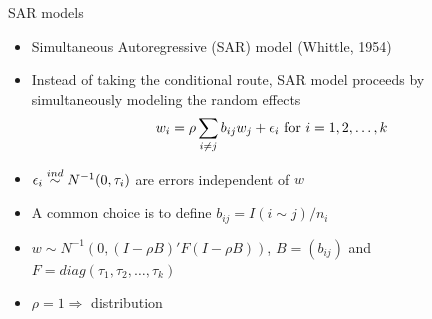 \begin{frame}{SAR models}
	\begin{itemize}
		\item \alert{Simultaneous Autoregressive (SAR)} model (Whittle, 1954)
		\item  Instead of taking the conditional route, SAR model proceeds by simultaneously modeling the random effects
		\[
		w_i =\rho \sum_{i \neq j} b_{ij} w_j + \epsilon_i \mbox{ for } i=1,2,\ldots,k
		\]
		\item $\epsilon_i \overset{ind}{\sim} N^{-1}(0,\tau_i)$ are errors independent of $w$   
		\item A common choice is to define $b_{ij}=I(i \sim j) / n_i$
		\item  {} $w \sim N^{-1}(0,(I-\rho B)'F(I-\rho B))$, $B=(b_{ij})$ and $F=diag(\tau_1,\tau_2,\ldots,\tau_k)$ 
		\item $\rho =1 \Rightarrow$  distribution
	\end{itemize}
\end{frame}


